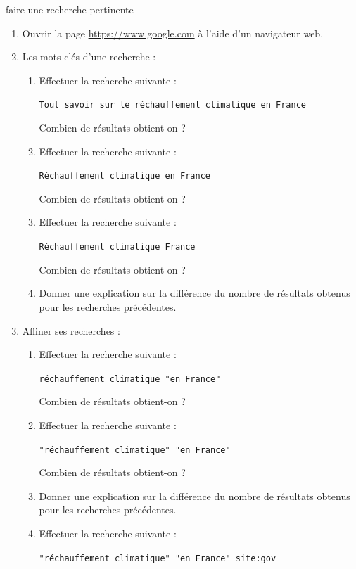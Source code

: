 \documentclass[a4paper, dvipsnames]{article}
\begin{document}
\begin{activite}[breakable]{faire une recherche pertinente}{}
  \begin{enumerate}
    \item Ouvrir la page \url{https://www.google.com} à l'aide d'un navigateur web.
    \item Les mots-clés d'une recherche :
      \begin{enumerate}
	\item Effectuer la recherche suivante :
	  \begin{center}
	    \verb|Tout savoir sur le réchauffement climatique en France|
	  \end{center}
	  Combien de résultats obtient-on ? \dotfill
	\item Effectuer la recherche suivante :
	  \begin{center}
	    \verb|Réchauffement climatique en France|
	  \end{center}
	  Combien de résultats obtient-on ? \dotfill
	\item Effectuer la recherche suivante :
	  \begin{center}
	    \verb|Réchauffement climatique France|
	  \end{center}
	  Combien de résultats obtient-on ? \dotfill
	\item Donner une explication sur la différence du nombre de résultats obtenus pour les recherches précédentes.
      \end{enumerate}
    \item Affiner ses recherches :
      \begin{enumerate}
	\item Effectuer la recherche suivante :
	  \begin{center}
	    \verb|réchauffement climatique "en France"|
	  \end{center}
	  Combien de résultats obtient-on ? \dotfill
	\item Effectuer la recherche suivante :
	  \begin{center}
	    \verb|"réchauffement climatique" "en France"|
	  \end{center}
	  Combien de résultats obtient-on ? \dotfill
	\item Donner une explication sur la différence du nombre de résultats obtenus pour les recherches précédentes.
	\item Effectuer la recherche suivante :
	  \begin{center}
	    \verb|"réchauffement climatique" "en France" site:gov|

\end{center}
\end{enumerate}
\end{enumerate}
\end{activite}
\end{document}
